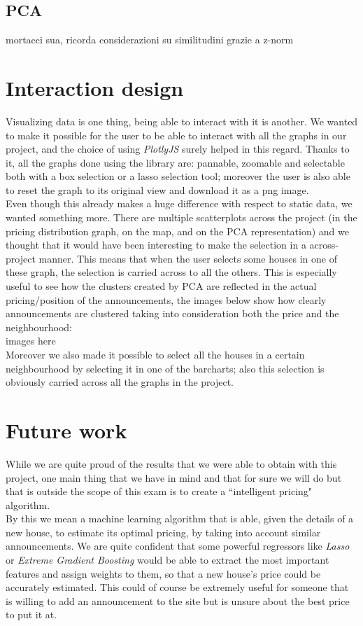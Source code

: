 \documentclass[11pt]{article}
\begin{document}
\subsection{PCA}
mortacci sua, ricorda considerazioni su similitudini grazie a z-norm

\section{Interaction design}
Visualizing data is one thing, being able to interact with it is another. We wanted to make it possible for the user to be able to interact with all the graphs in our project, and the choice of using {\em PlotlyJS} surely helped in this regard. Thanks to it, all the graphs done using the library are: pannable, zoomable and selectable both with a box selection or a lasso selection tool; moreover the user is also able to reset the graph to its original view and download it as a png image.\\
Even though this already makes a huge difference with respect to static data, we wanted something more. There are multiple scatterplots across the project (in the pricing distribution graph, on the map, and on the PCA representation) and we thought that it would have been interesting to make the selection in a across-project manner. This means that when the user selects some houses in one of these graph, the selection is carried across to all the others. This is especially useful to see how the clusters created by PCA are reflected in the actual pricing/position of the announcements, the images below show how clearly announcements are clustered taking into consideration both the price and the neighbourhood:\\
images here\\
Moreover we also made it possible to select all the houses in a certain neighbourhood by selecting it in one of the barcharts; also this selection is obviously carried across all the graphs in the project.

\section{Future work}
While we are quite proud of the results that we were able to obtain with this project, one main thing that we have in mind and that for sure we will do but that is outside the scope of this exam is to create a ``intelligent pricing" algorithm.\\
By this we mean a machine learning algorithm that is able, given the details of a new house, to estimate its optimal pricing, by taking into account similar announcements. We are quite confident that some powerful regressors like {\em Lasso} \cite{LASSO} or {\em Extreme Gradient Boosting} \cite{XGB} would be able to extract the most important features and assign weights to them, so that a new house's price could be accurately estimated. This could of course be extremely useful for someone that is willing to add an announcement to the site but is unsure about the best price to put it at.
\end{document}
